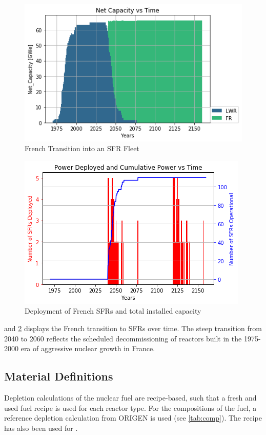 \begin{figure}[htbp!]
        \begin{center}
                \includegraphics[scale=0.7]{./images/french-transition/power_plot.png}
        \end{center}
        \caption{French Transition into an SFR Fleet}
        \label{fig:sfr_num}
\end{figure}
\begin{figure}[htbp!]
	\begin{center}
		\includegraphics[scale=0.7]{./images/french-transition/sfr_deploy.png}
	\end{center}
	\caption{Deployment of French \glspl{SFR} and total installed capacity}
	\label{fig:dep}
\end{figure}
\FloatBarrier


 and \cref{fig:dep} displays
the French transition to \glspl{SFR} over time.
The steep transition from 2040 to 2060 reflects the scheduled
decommissioning of reactors built in the 1975-2000
era of aggressive nuclear growth in France.


\subsection{Material Definitions}
Depletion calculations of the nuclear fuel are recipe-based, such that a fresh 
and used fuel recipe is used for each reactor type.
For the compositions of the fuel, a reference depletion calculation
from ORIGEN is used (see \cref{tab:comp}). The recipe has also been used for
\cite{wilson_adoption_2009}.


